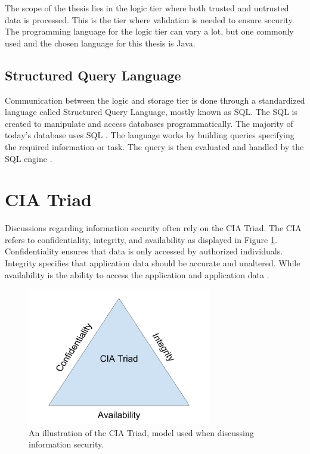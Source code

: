 The scope of the thesis lies in the logic tier where both trusted and untrusted data is processed. This is the tier where validation is needed to ensure security. The programming language for the logic tier can vary a lot, but one commonly used and the chosen language for this thesis is Java.



\subsection{Structured Query Language}
Communication between the logic and storage tier is done through a standardized language called Structured Query Language, mostly known as SQL. The SQL is created to manipulate and access databases programmatically. The majority of today's database uses SQL \parencite{Survey}. The language works by building queries specifying the required information or task. The query is then evaluated and handled by the SQL engine \parencite{DarieCristian2003TPGt}.



\section{CIA Triad}
\label{cia}
Discussions regarding information security often rely on the CIA Triad. The CIA refers to confidentiality, integrity, and availability as displayed in Figure \ref{fig:CIATriad}. Confidentiality ensures that data is only accessed by authorized individuals. Integrity specifies that application data should be accurate and unaltered. While availability is the ability to access the application and application data \parencite{2014C1-W}.

\begin{figure}[H]
    \centering
    \includegraphics[height=6cm]{images/CIATriad.jpg}
    \caption{An illustration of the CIA Triad, model used when discussing information security.}
    \label{fig:CIATriad}
\end{figure}



